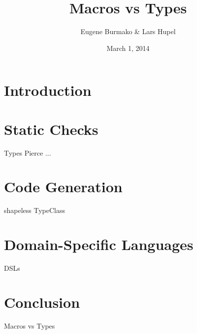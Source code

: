 \documentclass{beamer}
\begin{document}
  \title{Macros vs Types}
  \author{Eugene Burmako \& Lars Hupel}
  \date{March 1, 2014}

  \begin{frame}
    \maketitle
  \end{frame}

  \section{Introduction}

  \begin{frame}
  \end{frame}

  \section{Static Checks}

  \begin{frame}{Types}
    Pierce ...
  \end{frame}

  \section{Code Generation}

  \begin{frame}{shapeless}
    TypeClass
  \end{frame}

  \section{Domain-Specific Languages}

  \begin{frame}{DSLs}
  \end{frame}

  \section{Conclusion}

  \begin{frame}{Macros vs Types}
  \end{frame}
\end{document}
